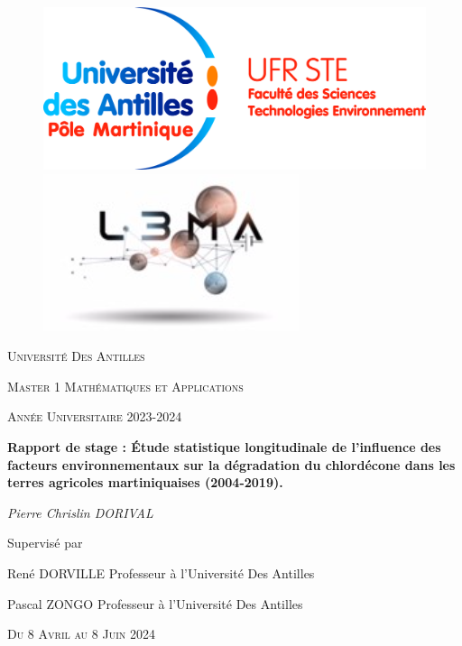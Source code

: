 \documentclass{report}
\begin{document}
\sloppy


\begin{titlepage}
    \centering
    
\begin{figure}[H]
\begin{minipage}[t]{0.45\linewidth}
\centering
\includegraphics[width =
0.6\linewidth]{logo.jpg}\par\vspace{1cm}

\end{minipage}
\hfill
\begin{minipage}[t]{0.45\linewidth}
\includegraphics[width = 0.4
\linewidth]{lmaa.png}\par\vspace{1cm}

\end{minipage}
\end{figure}
   
    {\scshape\Large Université Des Antilles \par}
    \vspace{1cm}
    {\scshape\Large Master 1 Mathématiques et Applications \par}
     \vspace{1cm}
    {\scshape\Large Année Universitaire 2023-2024 \par}
    \vspace{2cm}
    {\Large\bfseries Rapport de stage : Étude statistique longitudinale de l'influence des facteurs
environnementaux sur la dégradation du chlordécone dans les terres agricoles
martiniquaises (2004-2019). \par}
    \vspace{2cm}
    {\Large\itshape Pierre Chrislin DORIVAL \par}
    \vfill
    Supervisé par\par
    René DORVILLE                 Professeur à l'Université Des Antilles\par
    Pascal ZONGO                  Professeur à l'Université Des Antilles
    \vfill

    {\scshape\large Du 8 Avril au 8 Juin 2024}
\end{titlepage}
\end{document}
